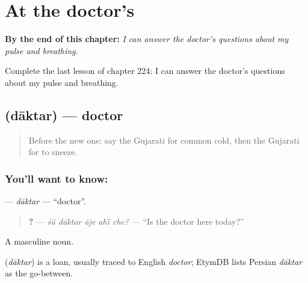 
\chapter{At the doctor's}
\label{ch:gu-at-the-doctor-s}

\begin{chapteropening}
\textbf{By the end of this chapter:} \emph{I can answer the doctor's questions about my pulse and breathing.}

Complete the last lesson of chapter 224: I can answer the doctor's questions about my pulse and breathing.
\end{chapteropening}

\section[\texorpdfstring{\gu{દાક્તર} (dāktar)}{દાક્તર (dāktar)}]{ (dāktar) — doctor}

\label{lesson:GU-C224-daktar}



\begin{quote}
Before the new one: say the Gujarati for common cold, then the Gujarati for to sneeze.
\end{quote}

\subsection*{You'll want to know: }
\textbf{} — \emph{dāktar} — \textquotedblleft{}doctor\textquotedblright{}.

\begin{quote}
\textbf{    ?} — \emph{śũ dāktar āje ahī̃ che?} — \textquotedblleft{}Is the doctor here today?\textquotedblright{}
\end{quote}

A masculine noun.

\begin{cousinweb}
\textbf{} (\emph{dāktar}) is a loan, usually traced to English \emph{doctor}; EtymDB lists Persian \emph{dāktar} as the go-between.
\end{cousinweb}

